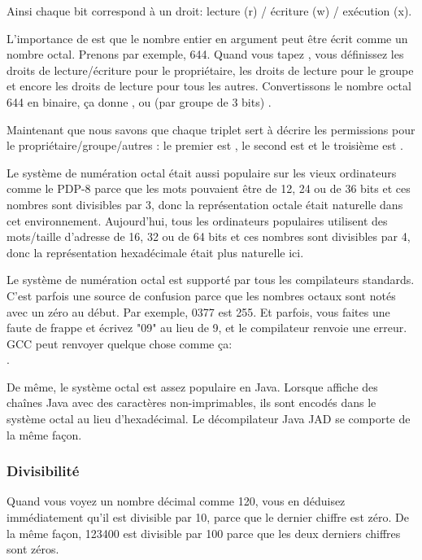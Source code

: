 Ainsi chaque bit correspond à un droit: lecture (r) / écriture (w) / exécution (x).

L'importance de  est que le nombre entier en argument peut être écrit
comme un nombre octal. Prenons par exemple, 644. Quand vous tapez , vous définissez les droits de lecture/écriture pour le propriétaire, les
droits de lecture pour le groupe et encore les droits de lecture pour tous les autres.
Convertissons le nombre octal 644 en binaire, ça donne , ou (par groupe
de 3 bits) .

Maintenant que nous savons que chaque triplet sert à décrire les permissions pour le
propriétaire/groupe/autres : le premier est , le second est  et le
troisième est .

Le système de numération octal était aussi populaire sur les vieux ordinateurs comme
le PDP-8 parce que les mots pouvaient être de 12, 24 ou de 36 bits et ces nombres
sont divisibles par 3, donc la représentation octale était naturelle dans cet
environnement. Aujourd'hui, tous les ordinateurs populaires utilisent des
mots/taille d'adresse de 16, 32 ou de 64 bits et ces nombres sont divisibles par 4,
donc la représentation hexadécimale était plus naturelle ici.

Le système de numération octal est supporté par tous les compilateurs \CCpp
standards. C'est parfois une source de confusion parce que les nombres octaux sont
notés avec un zéro au début. Par exemple, 0377 est 255. Et parfois, vous faites une
faute de frappe et écrivez "09" au lieu de 9, et le compilateur renvoie une erreur.
GCC peut renvoyer quelque chose comme ça:\\ .

De même, le système octal est assez populaire en Java. Lorsque \IDA affiche des
chaînes Java avec des caractères non-imprimables, ils sont encodés dans le système
octal au lieu d'hexadécimal.
Le décompilateur Java JAD se comporte de la même façon.

\subsubsection{Divisibilité}

Quand vous voyez un nombre décimal comme 120, vous en déduisez immédiatement qu'il
est divisible par 10, parce que le dernier chiffre est zéro.
De la même façon, 123400 est divisible par 100 parce que les deux derniers chiffres
sont zéros.

